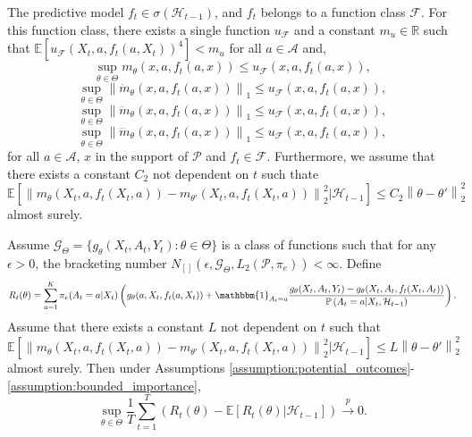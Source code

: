 \documentclass[10pt,a4paper]{amsart}
\newcommand{\E}{\mathbb{E}}
\newcommand{\R}{\mathbb{R}}
\newcommand{\norm}[1]{\left\lVert#1\right\rVert}
\begin{document}
\begin{assumption} \label{assumption:bracket_complexity}
The predictive model $f_{t} \in \sigma(\mathcal{H}_{t-1})$, and $f_t$ belongs to a function class $\mathcal{F}$. For this function class, there exists a single function $u_{\mathcal{F}}$ and a constant $m_{u} \in \R$ such that
$\mathbb{E}[u_{\mathcal{F}}(X_t,a,f_{t}(a,X_{t}))^{4}] < m_{u}$ for all $a \in \mathcal{A}$ and,
$$\sup_{\theta \in \Theta} m_{\theta}(x,a,f_{t}(a,x)) \le u_{\mathcal{F}}(x,a,f_{t}(a,x)),$$ 
$$\sup_{\theta \in \Theta} \norm{\dot{m}_{\theta}(x,a,f_{t}(a,x))}_{1} \le u_{\mathcal{F}}(x,a,f_{t}(a,x)),$$
$$\sup_{\theta \in \Theta} \norm{\ddot{m}_{\theta}(x,a,f_{t}(a,x))}_{1} \le u_{\mathcal{F}}(x,a,f_{t}(a,x)),$$
$$\sup_{\theta \in \Theta} \norm{\dddot{m}_{\theta}(x,a,f_{t}(a,x))}_{1} \le u_{\mathcal{F}}(x,a,f_{t}(a,x)),$$
for all $a \in \mathcal{A}$, $x$ in the support of $\mathcal{P}$ and $f_{t} \in \mathcal{F}$. Furthermore, we assume that there exists a constant $C_{2}$ not dependent on $t$ such thate
$$\E\left[ \norm{m_{\theta}(X_{t},a,f_{t}(X_t,a)) - m_{\theta'}(X_{t},a,f_{t}(X_t,a))}^{2}_{2} |\mathcal{H}_{t-1} \right] \le C_{2} \norm{ \theta - \theta'}_{2}^{2}$$ almost surely. 


\end{assumption}

\begin{lemma} \label{lemma:uniform_lln}

Assume $\mathcal{G}_{\Theta}=\{ g_{\theta}(X_t,A_{t},Y_{t}) : \theta \in \Theta  \}$ is a class of functions such that for any $\epsilon >0$, the bracketing number  $N_{[]}(\epsilon, \mathcal{G}_{\Theta}, L_{2}(\mathcal{P},\pi_{e})) < \infty$. Define
\begin{equation} \label{eqn:r_t_theta}
R_{t}(\theta) =  \sum_{a=1}^{K} \pi_{e}(A_{t} =a | X_{t}) \left( g_{\theta}(a,X_{t},f_{t}(a,X_{t}))   + \mathbbm{1}_{A_{t} = a} \frac{ g_{\theta}(X_{t},A_{t},Y_{t})  -  g_{\theta}(X_{t},A_{t},f_{t}(X_{t},A_{t})) }{ \mathbb{P} \left(A_{t} =a | X_{t},\mathcal{H}_{t-1} \right)  }\right).
\end{equation}
Assume that there exists a constant $L$ not dependent on $t$ such that
$$\E\left[ \norm{m_{\theta}(X_{t},a,f_{t}(X_t,a)) - m_{\theta'}(X_{t},a,f_{t}(X_t,a))}^{2}_{2} |\mathcal{H}_{t-1} \right] \le L \norm{ \theta - \theta'}_{2}^{2}$$ almost surely.
Then under Assumptions \ref{assumption:potential_outcomes}-\ref{assumption:bounded_importance},
$$\sup_{\theta \in \Theta }\frac{1}{T} \sum_{t=1}^{T} \left(R_t(\theta) - \mathbb{E}[R_{t}(\theta) |\mathcal{H}_{t-1}]\right) \overset{p}{\to} 0.$$
\end{lemma}
\end{document}

